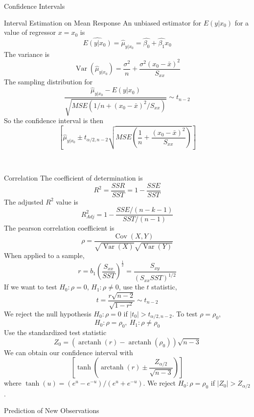 \documentclass{article}
\DeclareMathOperator{\Var}{Var}
\DeclareMathOperator{\Cov}{Cov}
\DeclareMathOperator{\atanh}{arctanh}
\begin{document}
\begin{multicols*}{3}
\begin{blackbox}{Confidence Intervals}
        \begin{brownbox}{Interval Estimation on Mean Response}
            An unbiased estimator for $E(y|x_0)$ for a value of regressor $x=x_0$ is 
            \[\widehat{E(y|x_0)} = \hat{\mu}_{y|x_0} = \hat{\beta_0} + \hat{\beta_1}x_0\]
            The variance is 
            \[\Var(\hat{\mu}_{y|x_0}) = \frac{\sigma^2}{n} + \frac{\sigma^2(x_0-\bar{x})^2}{S_{xx}}\]
            The sampling distribution for 
            \[\frac{\hat{\mu}_{y|x_0} - E(y|x_0)}{\sqrt{MSE(1/n + (x_0-\bar{x})^2/S_{xx})}} \sim t_{n-2}\]
            So the confidence interval is then 
            \[\left[\hat{\mu}_{y|x_0} \pm t_{\alpha/2, n-2}\sqrt{MSE\left(\frac{1}{n} + \frac{(x_0 - \bar{x})^2}{S_{xx}}\right)} \right]\]
        \end{brownbox}\\[-2ex]
    \end{blackbox}
    \begin{blackbox}{Correlation}
        The coefficient of determination is \\[-2ex]
        \[R^2 = \frac{SSR}{SST} = 1 - \frac{SSE}{SST}\]
        The adjusted $R^2$ value is \\[-2ex]
        \[R^2_{Adj} = 1 - \frac{SSE/(n-k-1)}{SST/(n-1)}\]
        The pearson correlation coefficient is \\[-2ex]
        \[\rho = \frac{\Cov(X,Y)}{\sqrt{\Var(X)}\sqrt{\Var(Y)}}\]
        When applied to a sample, \\[-3ex]
        \[
            r = b_1\left(\frac{S_{xx}}{SST}\right)^{\frac{1}{2}} = \frac{S_{xy}}{(S_{xx}SST)^{1/2}}  
        \]
        If we want to test $H_0: \rho = 0$, $H_1: \rho \neq 0$, use the $t$ statistic,\\[-3ex]
        \[t = \frac{r\sqrt{n-2}}{\sqrt{1-r^2}} \sim t_{n-2}\]
        We reject the null hypothesis $H_0: \rho = 0$ if $|t_0| > t_{\alpha/2, n-2}$. To test $\rho = \rho_0$, \\[-2ex]
        \[H_0: \rho = \rho_0, \ H_1: \rho \neq \rho_0\]
        Use the standardized test statistic\\[-2.3ex]
        \[Z_0 = (\atanh(r) - \atanh(\rho_0))\sqrt{n-3}\]
        We can obtain our confidence interval with 
        \[\left[\tanh\left(\atanh(r) \pm \frac{Z_{\alpha/2}}{\sqrt{n-3}}\right)\right]\]
        where $\tanh(u) = (e^u-e^{-u})/(e^u + e^{-u})$. We reject $H_0: \rho = \rho_0$ if $|Z_0| > Z_{\alpha/2}$.
    \end{blackbox}
    \begin{blackbox}{Prediction of New Observations}

\end{blackbox}
\end{multicols*}
\end{document}
